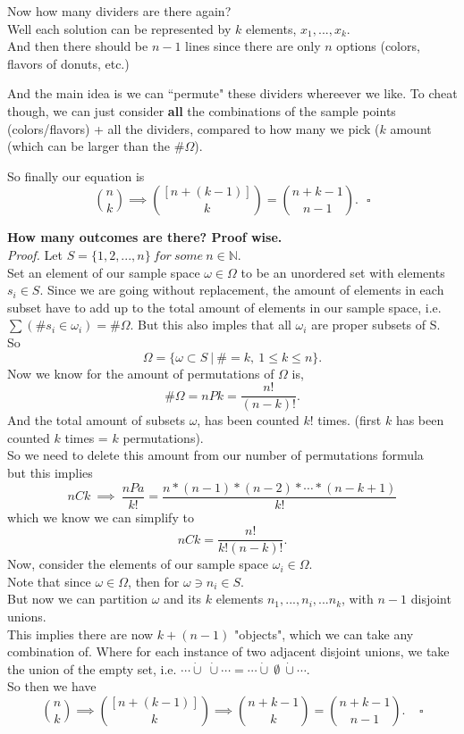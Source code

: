 \documentclass[12pt]{book}
\begin{document}
Now how many dividers are there again?\\
Well each solution can be represented by $k$ elements, $x_1,...,x_k$.\\
And then there should be $n-1$ lines since there are only $n$ options (colors, flavors of donuts, etc.)

And the main idea is we can ``permute" these dividers whereever we like. To cheat though, we can just consider \textbf{all} the combinations of the sample points (colors/flavors) + all the dividers, compared to how many we pick ($k$ amount (which can be larger than the $\#\Omega$).

So finally our equation is 
$$ {n \choose k} \implies {[n + (k-1)] \choose k} = {n+k-1 \choose n-1}.~~~\square$$

\noindent \textbf{How many outcomes are there? Proof wise.}\\
\textit{Proof.}
Let $S=\{1,2,...,n\}~for~some~n\in \mathbb{N}$.\\
Set an element of our sample space $\omega \in \Omega$ to be an unordered set with elements $s_i\in S$. Since we are going without replacement, the amount of elements in each subset have to add up to the total amount of elements in our sample space, i.e. $\sum (\#s_i \in  \omega _i) = \#\Omega$. But this also imples that all $\omega_i$ are proper subsets of S. \\
So $$\Omega = \big\{  \omega \subset S ~\big|~ \# = k,~1\leq k \leq n  \big\}.$$
Now we know for the amount of permutations of $\Omega$ is,
$$ \#\Omega = nPk = \frac{n!}{(n-k)!}.$$
And the total amount of subsets $\omega$, has been counted $k!$ times. (first $k$ has been counted $k$ times = $k$ permutations). \\
So we need to delete this amount from our number of permutations formula\\
but this implies\\
$$nCk ~\implies{}~ \frac{nPa}{k!} = \frac{n*(n-1)*(n-2)* \cdots *(n-k+1)}{k!}$$
which we know we can simplify to
$$nCk = \frac{n!}{k!(n-k)!}.$$
Now, consider the elements of our sample space $\omega_i \in \Omega$.\\
Note that since $\omega\in \Omega$, then for $\omega \ni n_i \in S$.\\
But now we can partition $\omega$ and its $k$ elements $n_1,...,n_i,...n_k$, with $n-1$ disjoint unions.\\
This implies there are now $k + (n-1)$ "objects", which we can take any combination of. Where for each instance of two adjacent disjoint unions, we take the union of the empty set, i.e. $\cdots \dot{\cup}~\dot{\cup} \cdots = \cdots \dot{\cup}~\emptyset~\dot{\cup} \cdots.$\\
So then we have \\
$${n \choose k} \implies {[n + (k-1)] \choose k} \implies {n + k-1 \choose k}= {n+k-1 \choose n-1}. ~~~~~\square$$
\end{document}
